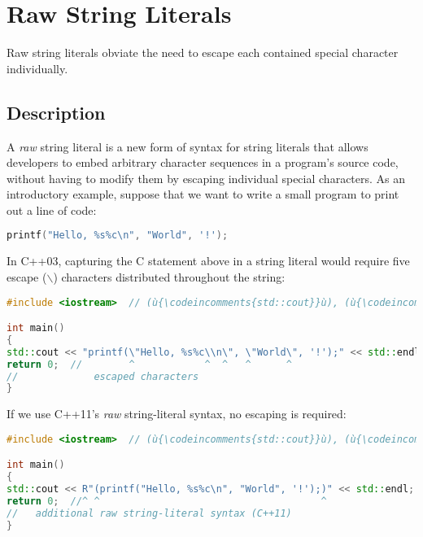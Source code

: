 \newpage
\section[Raw String Literals]{Raw String Literals}\label{raw-string-literals}


Raw string literals obviate the need to escape each contained special
character individually.

\subsection[Description]{Description}\label{description}

A \emph{raw} string literal is a new form of syntax for string literals
that allows developers to embed arbitrary character sequences in a
program's source code, without having to modify them by escaping
individual special characters. As an introductory example, suppose that
we want to write a small program to print out a line of code:

\begin{lstlisting}[language=C++]
printf("Hello, %s%c\n", "World", '!');
\end{lstlisting}

\noindent In C++03, capturing the C statement above in a string literal would
require five escape (\texttt{$\backslash$}) characters distributed
throughout the string:

\begin{lstlisting}[language=C++]
#include <iostream>  // (ù{\codeincomments{std::cout}}ù), (ù{\codeincomments{std::endl}}ù)

int main()
{
std::cout << "printf(\"Hello, %s%c\\n\", \"World\", '!');" << std::endl;
return 0;  //        ^            ^  ^   ^      ^
//             escaped characters
}
\end{lstlisting}

\noindent If we use C++11's \emph{raw} string-literal syntax, no escaping is
required:

\begin{lstlisting}[language=C++]
#include <iostream>  // (ù{\codeincomments{std::cout}}ù), (ù{\codeincomments{std::endl}}ù)

int main()
{
std::cout << R"(printf("Hello, %s%c\n", "World", '!');)" << std::endl;
return 0;  //^ ^                                      ^
//   additional raw string-literal syntax (C++11)
}
\end{lstlisting}

